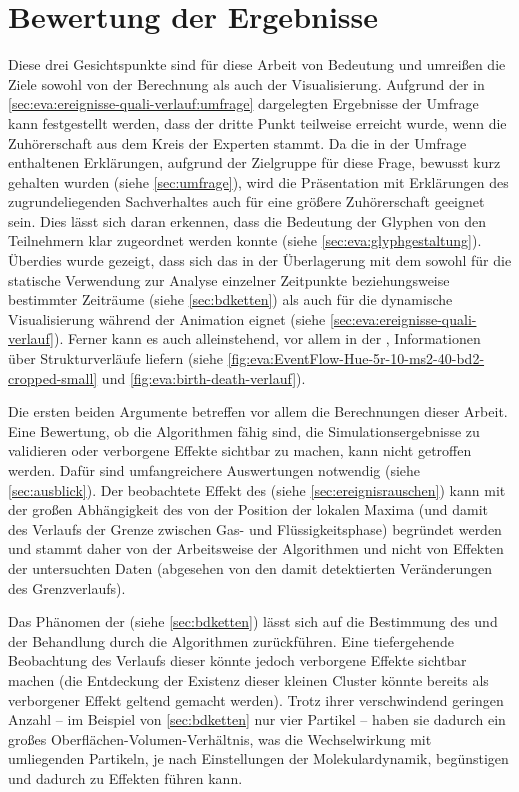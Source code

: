 \section{Bewertung der Ergebnisse}\label{sec:bewertung}
Diese drei Gesichtspunkte sind für diese Arbeit von Bedeutung und umreißen die Ziele sowohl von der Berechnung als auch der Visualisierung. Aufgrund der in \autoref{sec:eva:ereignisse-quali-verlauf:umfrage} dargelegten Ergebnisse der Umfrage kann festgestellt werden, dass der dritte Punkt teilweise erreicht wurde, wenn die Zuhörerschaft aus dem Kreis der Experten stammt. Da die in der Umfrage enthaltenen Erklärungen, aufgrund der Zielgruppe für diese Frage, bewusst kurz gehalten wurden (siehe \autoref{sec:umfrage}), wird die Präsentation mit Erklärungen des zugrundeliegenden Sachverhaltes auch für eine größere Zuhörerschaft geeignet sein. Dies lässt sich daran erkennen, dass die Bedeutung der Glyphen von den Teilnehmern klar zugeordnet werden konnte (siehe \autoref{sec:eva:glyphgestaltung}). Überdies wurde gezeigt, dass sich das  in der Überlagerung mit dem  sowohl für die statische Verwendung zur Analyse einzelner Zeitpunkte beziehungsweise bestimmter Zeiträume (siehe \autoref{sec:bdketten}) als auch für die dynamische Visualisierung während der Animation eignet (siehe \autoref{sec:eva:ereignisse-quali-verlauf}). Ferner kann es auch alleinstehend, vor allem in der , Informationen über Strukturverläufe liefern (siehe \autoref{fig:eva:EventFlow-Hue-5r-10-ms2-40-bd2-cropped-small} und \autoref{fig:eva:birth-death-verlauf}).

Die ersten beiden Argumente betreffen vor allem die Berechnungen dieser Arbeit. Eine Bewertung, ob die Algorithmen fähig sind, die Simulationsergebnisse zu validieren oder verborgene Effekte sichtbar zu machen, kann nicht getroffen werden. Dafür sind umfangreichere Auswertungen notwendig (siehe \autoref{sec:ausblick}). Der beobachtete Effekt des  (siehe \autoref{sec:ereignisrauschen}) kann mit der großen Abhängigkeit des \CFD von der Position der lokalen Maxima (und damit des Verlaufs der Grenze zwischen Gas- und Flüssigkeitsphase) begründet werden und stammt daher von der Arbeitsweise der Algorithmen und nicht von Effekten der untersuchten Daten (abgesehen von den damit detektierten Veränderungen des Grenzverlaufs).

Das Phänomen der  (siehe  \autoref{sec:bdketten}) lässt sich auf die Bestimmung des  und der Behandlung durch die Algorithmen zurückführen. Eine tiefergehende Beobachtung des Verlaufs dieser  könnte jedoch verborgene Effekte sichtbar machen (die Entdeckung der Existenz dieser kleinen Cluster könnte bereits als verborgener Effekt geltend gemacht werden). Trotz ihrer verschwindend geringen Anzahl -- im Beispiel von \autoref{sec:bdketten} nur vier Partikel -- haben sie dadurch ein großes Oberflächen-Volumen-Verhältnis, was die Wechselwirkung mit umliegenden Partikeln, je nach Einstellungen der Molekulardynamik, begünstigen und dadurch zu Effekten führen kann.

